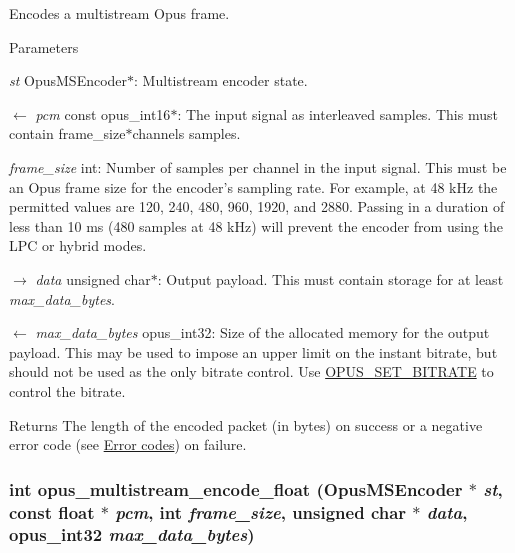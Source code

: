 Encodes a multistream Opus frame. 
\begin{DoxyParams}{Parameters}
\item[{\em st}]{\ttfamily OpusMSEncoder$\ast$}: Multistream encoder state. \item[\mbox{$\leftarrow$} {\em pcm}]{\ttfamily const opus\_\-int16$\ast$}: The input signal as interleaved samples. This must contain {\ttfamily frame\_\-size$\ast$channels} samples. \item[{\em frame\_\-size}]{\ttfamily int}: Number of samples per channel in the input signal. This must be an Opus frame size for the encoder's sampling rate. For example, at 48 kHz the permitted values are 120, 240, 480, 960, 1920, and 2880. Passing in a duration of less than 10 ms (480 samples at 48 kHz) will prevent the encoder from using the LPC or hybrid modes. \item[\mbox{$\rightarrow$} {\em data}]{\ttfamily unsigned char$\ast$}: Output payload. This must contain storage for at least {\itshape max\_\-data\_\-bytes\/}. \item[\mbox{$\leftarrow$} {\em max\_\-data\_\-bytes}]{\ttfamily opus\_\-int32}: Size of the allocated memory for the output payload. This may be used to impose an upper limit on the instant bitrate, but should not be used as the only bitrate control. Use \hyperlink{group__opus__encoderctls_ga0bb51947e355b33d0cb358463b5101a7}{OPUS\_\-SET\_\-BITRATE} to control the bitrate. \end{DoxyParams}
\begin{DoxyReturn}{Returns}
The length of the encoded packet (in bytes) on success or a negative error code (see \hyperlink{group__opus__errorcodes}{Error codes}) on failure. 
\end{DoxyReturn}
\hypertarget{group__opus__multistream_gaff832211e572536941b9d6094f9f42ce}{
\subsubsection[{opus\_\-multistream\_\-encode\_\-float}]{\setlength{\rightskip}{0pt plus 5cm}int opus\_\-multistream\_\-encode\_\-float ({\bf OpusMSEncoder} $\ast$ {\em st}, \/  const float $\ast$ {\em pcm}, \/  int {\em frame\_\-size}, \/  unsigned char $\ast$ {\em data}, \/  {\bf opus\_\-int32} {\em max\_\-data\_\-bytes})}}
\label{group__opus__multistream_gaff832211e572536941b9d6094f9f42ce}



